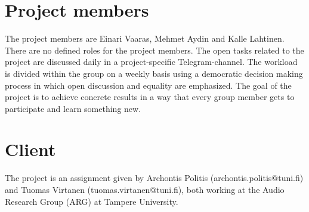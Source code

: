 \section{Project members}

The project members are Einari Vaaras, Mehmet Aydin and Kalle Lahtinen. There are no defined roles for the project members. The open tasks related to the project are discussed daily in a project-specific Telegram-channel. The workload is divided within the group on a weekly basis using a democratic decision making process in which open discussion and equality are emphasized. The goal of the project is to achieve concrete results in a way that every group member gets to participate and learn something new. 

\section{Client}

The project is an assignment given by Archontis Politis (archontis.politis@tuni.fi) and Tuomas Virtanen (tuomas.virtanen@tuni.fi), both working at the Audio Research Group (ARG) at Tampere University.

